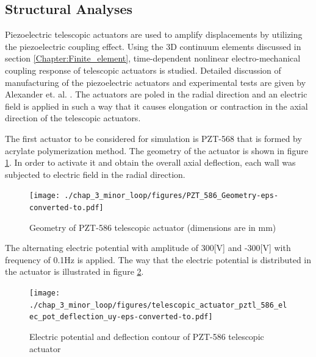 \subsection{Structural Analyses}
Piezoelectric telescopic actuators are used to amplify displacements by utilizing the piezoelectric coupling effect. 
Using the 3D continuum elements discussed in section \ref{Chapter:Finite_element}, 
time-dependent nonlinear electro-mechanical coupling response of telescopic actuators is studied. Detailed discussion of manufacturing of the piezoelectric actuators and experimental tests are given by Alexander et. al. \cite{Alexander,Alexander2003,Alexander2001}. 
The actuators are poled in the radial direction and an electric field is applied in such a way that it causes elongation or contraction in the axial direction of the telescopic actuators. 

The first actuator to be considered for simulation is PZT-568 that is formed by acrylate polymerization method. 
The geometry of the actuator is shown in figure \ref{fig:Geometry_PZT-586}. 
In order to activate it and obtain the overall axial deflection, each wall was
subjected to electric field in the radial direction.

\begin{figure}
\centering
\texttt{[image: ./chap\_3\_minor\_loop/figures/PZT\_586\_Geometry-eps-converted-to.pdf]}
\caption{Geometry of PZT-586 telescopic actuator (dimensions are in mm)}
\label{fig:Geometry_PZT-586}
\end{figure}

The alternating electric potential with amplitude of 300[V] and -300[V] with frequency of 0.1Hz is applied. 
The way that the electric potential is distributed in the actuator is illustrated in figure \ref{fig:PZT-586_response}. 

\begin{figure}
\centering
\texttt{[image: ./chap\_3\_minor\_loop/figures/telescopic\_actuator\_pztl\_586\_elec\_pot\_deflection\_uy-eps-converted-to.pdf]}
\caption{Electric potential and deflection contour of PZT-586 telescopic actuator}
\label{fig:PZT-586_response}
\end{figure}

